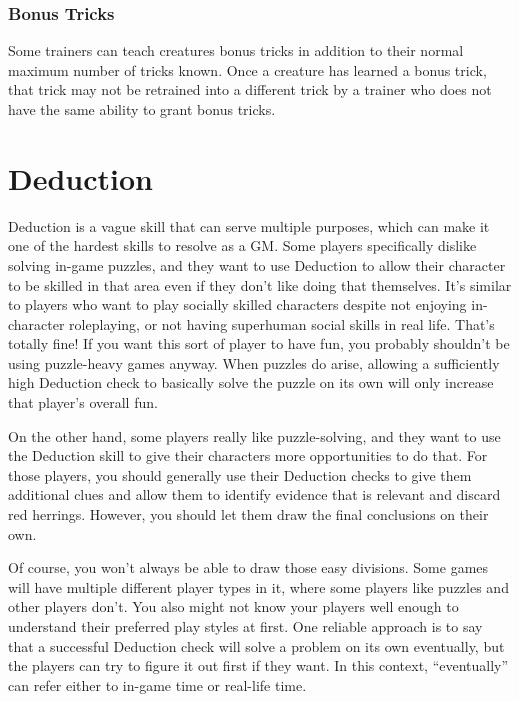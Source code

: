         \subsubsection{Bonus Tricks}\label{Bonus Tricks}
            Some trainers can teach creatures bonus tricks in addition to their normal maximum number of tricks known.
            Once a creature has learned a bonus trick, that trick may not be retrained into a different trick by a trainer who does not have the same ability to grant bonus tricks.

\section{Deduction}

    Deduction is a vague skill that can serve multiple purposes, which can make it one of the hardest skills to resolve as a GM.
    Some players specifically dislike solving in-game puzzles, and they want to use Deduction to allow their character to be skilled in that area even if they don't like doing that themselves.
    It's similar to players who want to play socially skilled characters despite not enjoying in-character roleplaying, or not having superhuman social skills in real life.
    That's totally fine!
    If you want this sort of player to have fun, you probably shouldn't be using puzzle-heavy games anyway.
    When puzzles do arise, allowing a sufficiently high Deduction check to basically solve the puzzle on its own will only increase that player's overall fun.

    On the other hand, some players really like puzzle-solving, and they want to use the Deduction skill to give their characters more opportunities to do that.
    For those players, you should generally use their Deduction checks to give them additional clues and allow them to identify evidence that is relevant and discard red herrings.
    However, you should let them draw the final conclusions on their own.

    Of course, you won't always be able to draw those easy divisions.
    Some games will have multiple different player types in it, where some players like puzzles and other players don't.
    You also might not know your players well enough to understand their preferred play styles at first.
    One reliable approach is to say that a successful Deduction check will solve a problem on its own eventually, but the players can try to figure it out first if they want.
    In this context, ``eventually'' can refer either to in-game time or real-life time.

